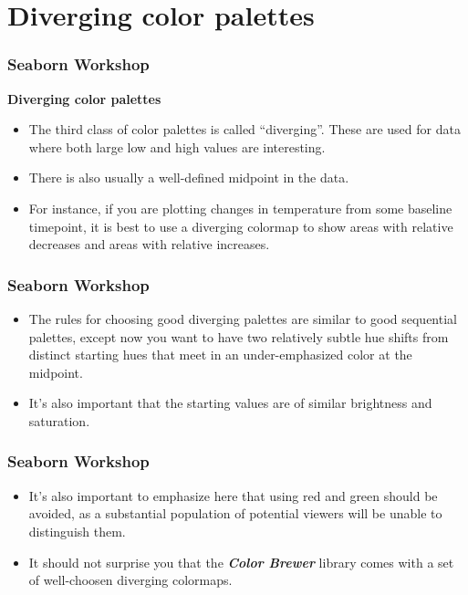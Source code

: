 \documentclass{beamer}
\begin{document}
\section{Diverging color palettes}
\begin{frame}[fragile]
	\frametitle{Seaborn Workshop}
	\large
	
	\noindent \textbf{Diverging color palettes}
	\begin{itemize}
		\item The third class of color palettes is called “diverging”. These are used for data where both large low and high values are interesting. 
		\item There is also usually a well-defined midpoint in the data. 
		\item For instance, if you are plotting changes in temperature from some baseline timepoint, it is best to use a diverging colormap to show areas with relative decreases and areas with relative increases.
	\end{itemize}
\end{frame}
\begin{frame}[fragile]
	\frametitle{Seaborn Workshop}
	\large
	\begin{itemize}
		\item The rules for choosing good diverging palettes are similar to good sequential palettes, except now you want to have two relatively subtle hue shifts from distinct starting hues that meet in an under-emphasized color at the midpoint. \item It’s also important that the starting values are of similar brightness and saturation.
	\end{itemize}
\end{frame}
\begin{frame}[fragile]
	\frametitle{Seaborn Workshop}
	\large
	\begin{itemize}
		\item It’s also important to emphasize here that using red and green should be avoided, as a substantial population of potential viewers will be unable to distinguish them.
		\item 
		It should not surprise you that the \textbf{\textit{Color Brewer}} library comes with a set of well-choosen diverging colormaps.
	\end{itemize}
	
\end{frame}
\end{document}
